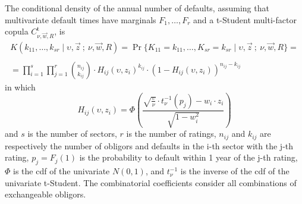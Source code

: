 \documentclass[11pt,fleqn]{book} %
\begin{document}
\begin{proposition}
	\label{prop:cdand}
	The conditional density of the annual number of defaults, assuming 
	that multivariate default times have marginals $F_1,\dots,F_r$ and a 
	t-Student multi-factor copula $C_{\nu,\vec{w},R}^{\text{t}}$, is
	\begin{displaymath}
		\begin{array}{l}
			K(k_{11},\dots,k_{sr} \mid \upsilon,\vec{z}\ ;\ \nu,\vec{w}, R) = 
			\Pr\{K_{11}=k_{11},\dots,K_{sr}=k_{sr} \mid \upsilon,\vec{z}\ ;\ \nu, \vec{w}, R\} = \\
			\\
			= \displaystyle \prod_{i=1}^s \prod_{j=1}^r \binom{n_{ij}}{k_{ij}} \cdot
			H_{ij}(\upsilon,z_i)^{k_{ij}} \cdot
			\left( 1 - H_{ij}(\upsilon,z_i) \right)^{n_{ij}-k_{ij}}
		\end{array}
	\end{displaymath}
	in which
	\begin{displaymath}
		H_{ij}(\upsilon,z_i) = \Phi\left(  
		\frac{\sqrt{\frac{\upsilon}{\nu}} \cdot t_{\nu}^{-1}(p_j) - w_i\cdot z_i}{\sqrt{1-w_i^2}}
		\right)
	\end{displaymath}
	and $s$ is the number of sectors, $r$ is the number of ratings,
	$n_{ij}$ and $k_{ij}$ are respectively the number of obligors and 
	defaults in the i-th sector with the j-th rating, $p_j = F_j(1)$ 
	is the probability to default within 1 year of the j-th rating,
	$\Phi$ is the cdf of the univariate $N(0,1)$, and $t_{\nu}^{-1}$ is the 
	inverse of the cdf of the univariate t-Student. The combinatorial 
	coefficients consider all combinations of exchangeable obligors.
\end{proposition}
\end{document}
